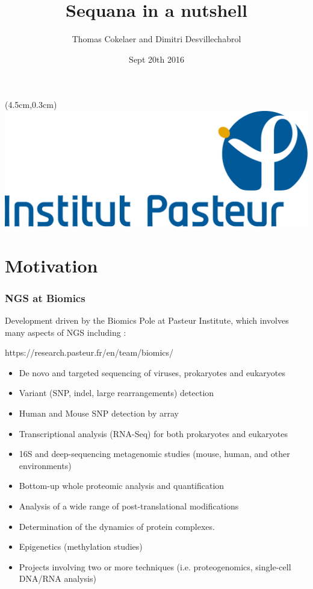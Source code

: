 \documentclass{beamer}
\title{Sequana in a nutshell}
\author[T.Cokelaer \& D.Desvillechabrol]{Thomas Cokelaer and Dimitri Desvillechabrol}
\institute{Institut Pasteur}
\date{Sept 20th 2016}
\begin{document}

\begin{frame}[plain]
    \titlepage
    \begin{textblock*}{5cm}(4.5cm,0.3cm)
        \includegraphics[scale=0.09]{images/Institut_Pasteur.png}
    \end{textblock*}
\end{frame}


\section{Motivation}

\begin{frame}
 \frametitle{NGS at Biomics}
 
 Development driven by the Biomics Pole at Pasteur Institute, which involves
 many aspects of NGS including :
 
 \tiny
 \begin{block}{https://research.pasteur.fr/en/team/biomics/}
  \begin{itemize}
  \item De novo and targeted sequencing of viruses, prokaryotes and eukaryotes
  \item Variant (SNP, indel, large rearrangements) detection
  \item Human and Mouse SNP detection by array
  \item Transcriptional analysis (RNA-Seq) for both prokaryotes and eukaryotes
  \item 16S and deep-sequencing metagenomic studies (mouse, human, and other environments)
  \item Bottom-up whole proteomic analysis and quantification
  \item Analysis of a wide range of post-translational modifications
  \item Determination of the dynamics of protein complexes.
  \item Epigenetics (methylation studies)
  \item Projects involving two or more techniques (i.e. proteogenomics, single-cell DNA/RNA analysis)
  \end{itemize}
 \end{block}
 \small 
\end{frame}
\end{document}

